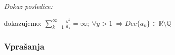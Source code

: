 \documentclass{beamer}
\def\Q{\mathbb{Q}} %
\def\R{\mathbb{R}} %
\begin{document}
\begin{frame}
    \emph{Dokaz posledice:}

    dokazujemo: $\sum_{k=1}^{\infty}\frac{y^k}{a_k} = \infty; \ \forall y > 1 \ \Rightarrow Dec\{a_k\} \in \R \setminus \Q$
    \newline
    \newline
    \newline
    \newline
    \newline
    \newline
    \newline
    \newline
    \newline
    \newline
    \newline
    \newline
    \newline
\end{frame}

\begin{frame}
    \frametitle{Vprašanja}
\end{frame}
\end{document}
